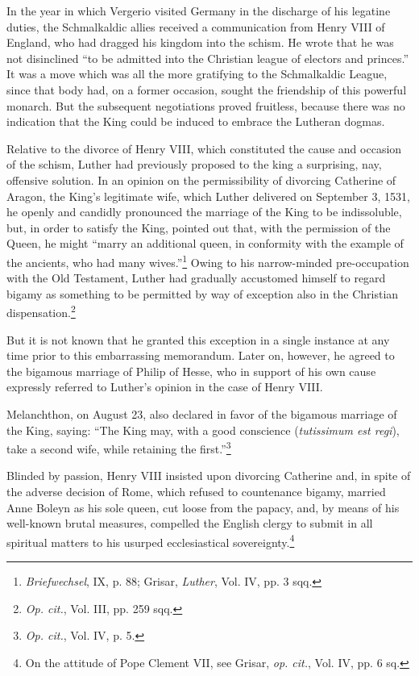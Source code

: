 In the year in which Vergerio visited Germany in the discharge
of his legatine duties, the Schmalkaldic allies received a communication
from Henry VIII of England, who had dragged his kingdom
into the schism. He wrote that he was not disinclined “to be admitted
into the Christian league of electors and princes.” It was a move
which was all the more gratifying to the Schmalkaldic League, since
that body had, on a former occasion, sought the friendship of this
powerful monarch. But the subsequent negotiations proved fruitless,
because there was no indication that the King could be induced to
embrace the Lutheran dogmas.

Relative to the divorce of Henry VIII, which constituted the cause and
occasion of the schism, Luther had previously proposed to the king a
surprising, nay, offensive solution. In an opinion on the permissibility of
divorcing Catherine of Aragon, the King’s legitimate wife, which Luther
delivered on September 3, 1531, he openly and candidly pronounced the marriage
of the King to be indissoluble, but, in order to satisfy the King, pointed
out that, with the permission of the Queen, he might “marry an additional
queen, in conformity with the example of the ancients, who had many
wives.”\footnote
{\textit{Briefwechsel}, IX, p. 88; Grisar, \textit{Luther}, Vol. IV, pp. 3 sqq.}
 Owing to his narrow-minded pre-occupation with the Old Testament,
Luther had gradually accustomed himself to regard bigamy as something
to be permitted by way of exception also in the Christian dispensation.\footnote
{\textit{Op. cit.}, Vol. III, pp. 259 sqq.}

But it is not known that he granted this exception in a single
instance at any time prior to this embarrassing memorandum. Later on, however,
he agreed to the bigamous marriage of Philip of Hesse, who in support
of his own cause expressly referred to Luther’s opinion in the case of
Henry VIII.

Melanchthon, on August 23, also declared in favor of the bigamous marriage
of the King, saying: “The King may, with a good conscience (\textit{tutissimum
est regi}), take a second wife, while retaining the first.”\footnote{\textit{Op. cit.}, Vol. IV, p. 5.}

Blinded by passion, Henry VIII insisted upon divorcing Catherine
and, in spite of the adverse decision of Rome, which refused to countenance
bigamy, married Anne Boleyn as his sole queen, cut
loose from the papacy, and, by means of his well-known brutal
measures, compelled the English clergy to submit in all spiritual
matters to his usurped ecclesiastical sovereignty.\footnote{On the attitude of Pope Clement VII, see Grisar, \textit{op. cit.}, Vol. IV, pp. 6 sq.}

